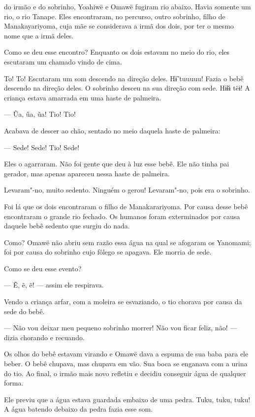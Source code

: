 
 do irmão e do sobrinho, Yoahiwë e Omawë fugiram rio
abaixo. Havia somente um rio, o rio Tanape. Eles encontraram, no
percurso, outro sobrinho, filho de Manakayariyoma, cuja mãe se
considerava a irmã dos dois, por ter o mesmo nome que a irmã deles. 

Como se deu esse encontro? Enquanto os dois estavam no meio do rio, eles
escutaram um chamado vindo de cima. 

To! To! Escutaram um som descendo na direção deles. Hɨ̃ tuuuuu! Fazia o
bebê descendo na direção deles. O sobrinho desceu na sua direção com
sede. Hɨ̃ɨɨ tëɨ! A criança estava amarrada em uma haste de palmeira.

--- Ũa, ũa, ũa! Tio! Tio!

Acabava de descer ao chão, sentado no meio daquela haste de palmeira:

--- Sede! Sede! Tio! Sede!

Eles o agarraram. Não foi gente que deu à luz esse bebê. Ele não
tinha pai gerador, mas apenas apareceu nessa haste de palmeira. 

Levaram"-no, muito sedento. Ninguém o gerou! Levaram"-no, pois era o
sobrinho. 

Foi lá que os dois encontraram o filho de Manakarariyoma. Por causa
desse bebê encontraram o grande rio fechado. Os humanos foram
exterminados por causa daquele bebê sedento que surgiu do nada. 

Como? Omawë não abriu sem razão essa água na qual se afogaram os
Yanomami; foi por causa do sobrinho cujo fôlego se apagava. Ele morria de
sede. 

Como se deu esse evento?

--- Ẽ, ẽ, ẽ! --- assim ele respirava. 

Vendo a criança arfar, com a moleira se esvaziando, o tio chorava por
causa da sede do bebê. 

--- Não vou deixar meu pequeno sobrinho morrer! Não vou ficar feliz,
não! --- dizia chorando e recuando. 

Os olhos do bebê estavam virando e Omawë dava a espuma de sua baba para
ele beber. O bebê chupava, mas chupava em vão. Sua boca se enganava com a
urina do tio. Ao final, o irmão mais novo refletiu e decidiu conseguir água de qualquer forma. 

Ele previu que a água estava guardada embaixo de uma pedra. Tuku, tuku, tuku! A água batendo debaixo da pedra fazia esse som. 

